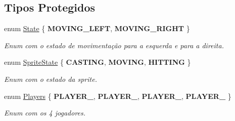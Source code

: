 \subsection*{Tipos Protegidos}
\begin{DoxyCompactItemize}
\item 
\mbox{\label{classFrostNova_a849f88fb08f1a9d3818200ebb8ba7618}} 
enum \mbox{\hyperlink{classFrostNova_a849f88fb08f1a9d3818200ebb8ba7618}{State}} \{ {\bfseries M\+O\+V\+I\+N\+G\+\_\+\+L\+E\+FT}, 
{\bfseries M\+O\+V\+I\+N\+G\+\_\+\+R\+I\+G\+HT}
 \}
\begin{DoxyCompactList}\small\item\em Enum com o estado de movimentação para a esquerda e para a direita. \end{DoxyCompactList}\item 
\mbox{\label{classFrostNova_a217d48933042a86cda21d019e09abd9c}} 
enum \mbox{\hyperlink{classFrostNova_a217d48933042a86cda21d019e09abd9c}{Sprite\+State}} \{ {\bfseries C\+A\+S\+T\+I\+NG}, 
{\bfseries M\+O\+V\+I\+NG}, 
{\bfseries H\+I\+T\+T\+I\+NG}
 \}
\begin{DoxyCompactList}\small\item\em Enum com o estado da sprite. \end{DoxyCompactList}\item 
\mbox{\label{classFrostNova_a2c04b9868751e17aeb351c684cc7e725}} 
enum \mbox{\hyperlink{classFrostNova_a2c04b9868751e17aeb351c684cc7e725}{Players}} \{ {\bfseries P\+L\+A\+Y\+E\+R\+\_}, 
{\bfseries P\+L\+A\+Y\+E\+R\+\_}, 
{\bfseries P\+L\+A\+Y\+E\+R\+\_}, 
{\bfseries P\+L\+A\+Y\+E\+R\+\_}
 \}
\begin{DoxyCompactList}\small\item\em Enum com os 4 jogadores. \end{DoxyCompactList}\end{DoxyCompactItemize}

